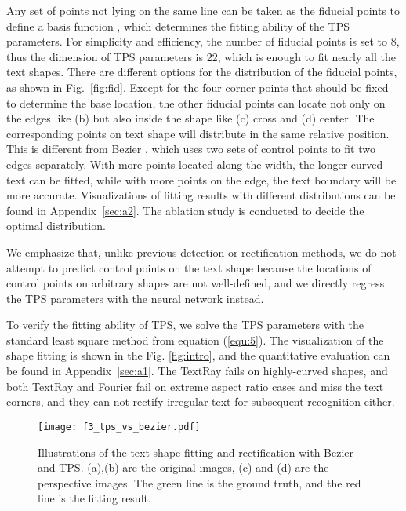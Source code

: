 \documentclass[sigconf]{acmart}
\begin{document}
	Any set of points not lying on the same line can be taken as the fiducial points to define a basis function , which determines the fitting ability of the TPS parameters. For simplicity and efficiency, the number of fiducial points  is set to 8, thus the dimension of TPS parameters  is 22, which is enough to fit nearly all the text shapes. There are different options for the distribution of the fiducial points, as shown in Fig.~\ref{fig:fid}. Except for the four corner points that should be fixed to determine the base location, the other fiducial points can locate not only on the edges like (b) but also inside the shape like (c) cross and (d) center. The corresponding points on text shape  
	will distribute in the same relative position. This is different from Bezier \cite{Liu2020ABCNet}, which uses two sets of control points to fit two edges separately. 
	With more points located along the width, the longer curved text can be fitted, while with more points on the edge, the text boundary will be more accurate. Visualizations of fitting results with different distributions can be found in Appendix~\ref{sec:a2}. The ablation study is conducted to decide the optimal distribution.
	
	We emphasize that, unlike previous detection or rectification methods, we do not attempt to predict control points on the text shape  because the locations of control points on arbitrary shapes are not well-defined, 
	and we directly regress the TPS parameters  with the neural network instead.
	
	
	To verify the fitting ability of TPS,
	we solve the TPS parameters  with the standard least square method from equation (\ref{equ:5}).
	The visualization of the shape fitting is shown in the Fig. \ref{fig:intro}, and the quantitative evaluation can be found in Appendix~\ref{sec:a1}. The TextRay \cite{Wang2020textray} fails on highly-curved shapes, and both TextRay \cite{Wang2020textray} and Fourier \cite{zhu2021fourier} fail on extreme aspect ratio cases and miss the text corners, and they can not rectify irregular text for subsequent recognition either.
	
	\begin{figure}
		\centering
		\setlength{\abovecaptionskip}{2px}
		\subfigbottomskip=-3pt
		\subfigcapskip=-5pt
		\texttt{[image: f3\_tps\_vs\_bezier.pdf]}
		\caption{Illustrations of the text shape fitting and rectification with Bezier \cite{Liu2020ABCNet} and TPS. (a),(b) are the original images, (c) and (d) are the perspective images. The green line is the ground truth, and the red line is the fitting result.}
		\label{fig:tps_vs_bezier}
		\vspace{-12px}
	\end{figure}
	
\end{document}
